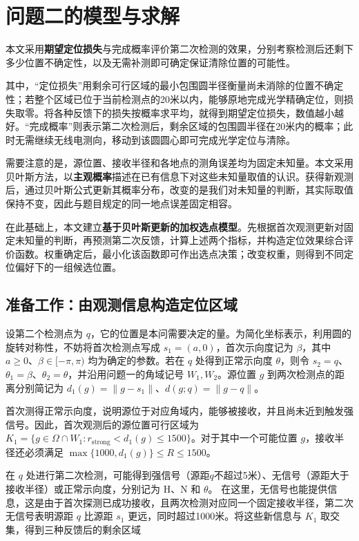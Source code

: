 \section{问题二的模型与求解}

本文采用\textbf{期望定位损失}与{完成概率}评价第二次检测的效果，分别考察检测后还剩下多少位置不确定性，以及无需补测即可确定保证清除位置的可能性。

其中，“定位损失”用剩余可行区域的最小包围圆半径衡量尚未消除的位置不确定性；若整个区域已位于当前检测点的20米以内，能够原地完成光学精确定位，则损失取零。将各种反馈下的损失按概率求平均，就得到期望定位损失，数值越小越好。“完成概率”则表示第二次检测后，剩余区域的包围圆半径在20米内的概率；此时无需继续无线电测向，移动到该圆圆心即可完成光学定位与清除。

需要注意的是，源位置、接收半径和各地点的测角误差均为固定未知量。本文采用贝叶斯方法，以\textbf{主观概率}描述在已有信息下对这些未知量取值的认识。获得新观测后，通过贝叶斯公式更新其概率分布，改变的是我们对未知量的判断，其实际取值保持不变，因此与题目规定的同一地点误差固定相容。

在此基础上，本文建立\textbf{基于贝叶斯更新的加权选点模型}。先根据首次观测更新对固定未知量的判断，再预测第二次反馈，计算上述两个指标，并构造定位效果综合评价函数。权重确定后，最小化该函数即可作出选点决策；改变权重，则得到不同定位偏好下的一组候选位置。

\subsection{准备工作：由观测信息构造定位区域}

设第二个检测点为 \(q\)，它的位置是本问需要决定的量。为简化坐标表示，利用圆的旋转对称性，不妨将首次检测点写成 \(s_1=(a,0)\)，首次示向度记为 \(\beta\)，其中 \(a\ge0\)、\(\beta\in[-\pi,\pi)\) 均为确定的参数。若在 \(q\) 处得到正常示向度 \(\theta\)，则令 \(s_2=q\)、\(\theta_1=\beta\)、\(\theta_2=\theta\)，并沿用问题一的角域记号 \(W_1,W_2\)。源位置 \(g\) 到两次检测点的距离分别简记为 \(d_1(g)=\|g-s_1\|\)、\(d(g;q)=\|g-q\|\)。

首次测得正常示向度，说明源位于对应角域内，能够被接收，并且尚未近到触发强信号。因此，首次观测后的源位置可行区域为 \(K_1=\{g\in\Omega\cap W_1:r_{\mathrm{strong}}<d_1(g)\le1500\}\)。对于其中一个可能位置 \(g\)，接收半径还必须满足 \(\max\{1000,d_1(g)\}\le R\le1500\)。

在 \(q\) 处进行第二次检测，可能得到强信号（源距\(q\)不超过5米）、无信号（源距大于接收半径）或正常示向度，分别记为 \(\mathrm H\)、\(\mathrm N\) 和 \(\theta\)。
在这里，无信号也能提供信息，这是由于首次探测已成功接收，且两次检测对应同一个固定接收半径，第二次无信号表明源距 \(q\) 比源距 \(s_1\) 更远，同时超过1000米。将这些新信息与 \(K_1\) 取交集，得到三种反馈后的剩余区域

